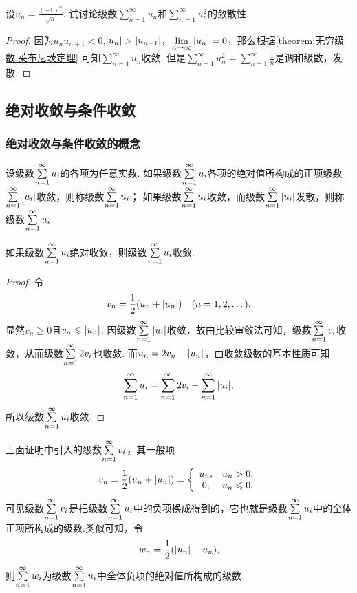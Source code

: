 \begin{example}
\def\s{\sum\limits_{n=1}^\infty }%
\def\l{\lim\limits_{n\to\infty}}%
设\(u_n = \frac{(-1)^n}{\sqrt{n}}\).
试讨论级数\(\s u_n\)和\(\s u_n^2\)的敛散性.
\begin{proof}
因为\(u_n u_{n+1} < 0\),\(\abs{u_n} > \abs{u_{n+1}}\)，\(\l \abs{u_n} = 0\)，那么根据\cref{theorem:无穷级数.莱布尼茨定理} 可知\(\s u_n\)收敛.
但是\(\s u_n^2 = \s \frac{1}{n}\)是调和级数，发散.
\end{proof}
\end{example}

\subsection{绝对收敛与条件收敛}
\subsubsection{绝对收敛与条件收敛的概念}
\begin{definition}
设级数\(\s u_i\)的各项为任意实数.
如果级数\(\s u_i\)各项的绝对值所构成的正项级数\(\s {\abs{u_i}}\)收敛，则称级数\(\s u_i\)；
如果级数\(\s u_i\)收敛，而级数\(\s {\abs{u_i}}\)发散，则称级数\(\s u_i\).
\end{definition}

\begin{theorem}\label{theorem:无穷级数.绝对收敛级数必定收敛}
如果级数\(\s u_i\)绝对收敛，则级数\(\s u_i\)收敛.
\begin{proof}
令\[
v_n = \frac{1}{2} (u_n + \abs{u_n})
\quad(n=1,2,\dotsc).
\]显然\(v_n \geqslant 0\)且\(v_n \leqslant \abs{u_n}\).
因级数\(\s \abs{u_i}\)收敛，故由比较审敛法可知，级数\(\s v_i\)收敛，从而级数\(\s 2 v_i\)也收敛.
而\(u_n = 2 v_n - \abs{u_n}\)，由收敛级数的基本性质可知\[
\s u_i = \s 2 v_i - \s \abs{u_i},
\]所以级数\(\s u_i\)收敛.
\end{proof}
\end{theorem}

上面证明中引入的级数\(\s v_i\)，其一般项\[
v_n = \frac{1}{2} (u_n + \abs{u_n})
= \left\{ \begin{array}{cl}
u_n, & u_n > 0, \\
0, & u_n \leqslant 0,
\end{array} \right.
\]可见级数\(\s v_i\)是把级数\(\s u_i\)中的负项换成得到的，它也就是级数\(\s u_i\)中的全体正项所构成的级数.类似可知，令\[
w_n = \frac{1}{2} (\abs{u_n} - u_n),
\]则\(\s w_i\)为级数\(\s u_i\)中全体负项的绝对值所构成的级数.

